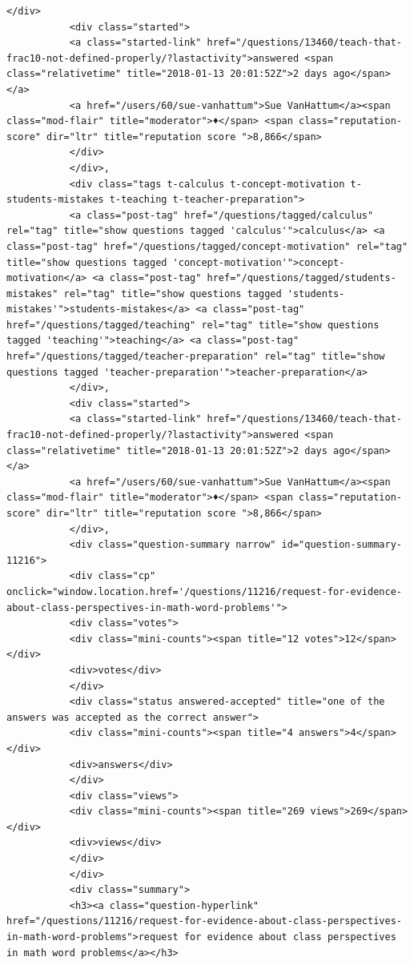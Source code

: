 \documentclass[11pt]{article}
\begin{document}
\begin{Verbatim}[commandchars=\\\{\}]
           </div>
           <div class="started">
           <a class="started-link" href="/questions/13460/teach-that-frac10-not-defined-properly/?lastactivity">answered <span class="relativetime" title="2018-01-13 20:01:52Z">2 days ago</span></a>
           <a href="/users/60/sue-vanhattum">Sue VanHattum</a><span class="mod-flair" title="moderator">♦</span> <span class="reputation-score" dir="ltr" title="reputation score ">8,866</span>
           </div>
           </div>,
           <div class="tags t-calculus t-concept-motivation t-students-mistakes t-teaching t-teacher-preparation">
           <a class="post-tag" href="/questions/tagged/calculus" rel="tag" title="show questions tagged 'calculus'">calculus</a> <a class="post-tag" href="/questions/tagged/concept-motivation" rel="tag" title="show questions tagged 'concept-motivation'">concept-motivation</a> <a class="post-tag" href="/questions/tagged/students-mistakes" rel="tag" title="show questions tagged 'students-mistakes'">students-mistakes</a> <a class="post-tag" href="/questions/tagged/teaching" rel="tag" title="show questions tagged 'teaching'">teaching</a> <a class="post-tag" href="/questions/tagged/teacher-preparation" rel="tag" title="show questions tagged 'teacher-preparation'">teacher-preparation</a>
           </div>,
           <div class="started">
           <a class="started-link" href="/questions/13460/teach-that-frac10-not-defined-properly/?lastactivity">answered <span class="relativetime" title="2018-01-13 20:01:52Z">2 days ago</span></a>
           <a href="/users/60/sue-vanhattum">Sue VanHattum</a><span class="mod-flair" title="moderator">♦</span> <span class="reputation-score" dir="ltr" title="reputation score ">8,866</span>
           </div>,
           <div class="question-summary narrow" id="question-summary-11216">
           <div class="cp" onclick="window.location.href='/questions/11216/request-for-evidence-about-class-perspectives-in-math-word-problems'">
           <div class="votes">
           <div class="mini-counts"><span title="12 votes">12</span></div>
           <div>votes</div>
           </div>
           <div class="status answered-accepted" title="one of the answers was accepted as the correct answer">
           <div class="mini-counts"><span title="4 answers">4</span></div>
           <div>answers</div>
           </div>
           <div class="views">
           <div class="mini-counts"><span title="269 views">269</span></div>
           <div>views</div>
           </div>
           </div>
           <div class="summary">
           <h3><a class="question-hyperlink" href="/questions/11216/request-for-evidence-about-class-perspectives-in-math-word-problems">request for evidence about class perspectives in math word problems</a></h3>

\end{Verbatim}
\end{document}

